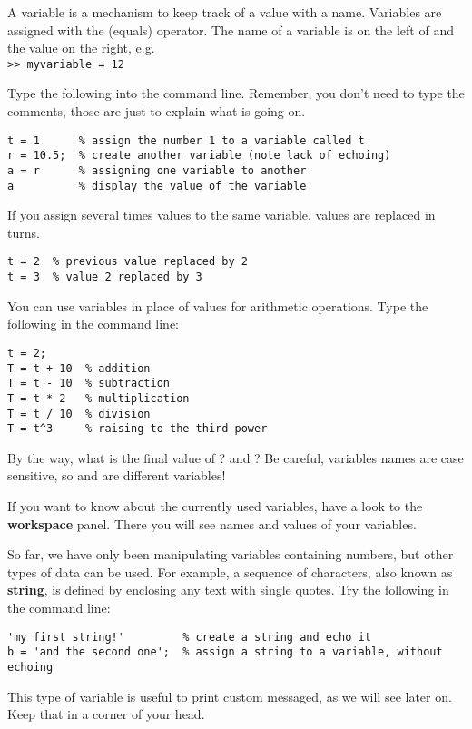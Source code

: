 \documentclass{article}
\begin{document}
A variable is a mechanism to keep track of a value with a name.
Variables are assigned with the \mcode{=} (equals) operator.
The name of a variable is on the left of \mcode{=} and the value on the right, e.g.\\
\verb|>> myvariable = 12|

Type the following into the command line.
Remember, you don't need to type the comments, those are just to explain what is going on.
\begin{lstlisting}
t = 1      % assign the number 1 to a variable called t
r = 10.5;  % create another variable (note lack of echoing)
a = r      % assigning one variable to another
a          % display the value of the variable
\end{lstlisting}

If you assign several times values to the same variable, values are replaced in turns.
\begin{lstlisting}
t = 2  % previous value replaced by 2
t = 3  % value 2 replaced by 3
\end{lstlisting}

You can use variables in place of values for arithmetic operations.
Type the following in the command line:
\begin{lstlisting}
t = 2;
T = t + 10  % addition
T = t - 10  % subtraction
T = t * 2   % multiplication
T = t / 10  % division
T = t^3     % raising to the third power
\end{lstlisting}

By the way, what is the final value of ? and ?
Be careful, variables names are case sensitive, so  and  are different variables!

If you want to know about the currently used variables, have a look to the \textbf{workspace} panel.
There you will see names and values of your variables.

So far, we have only been manipulating variables containing numbers, but other types of data can be used.
For example, a sequence of characters, also known as \textbf{string}, is defined by enclosing any text with single quotes.
Try the following in the command line:
\begin{lstlisting}
'my first string!'         % create a string and echo it
b = 'and the second one';  % assign a string to a variable, without echoing
\end{lstlisting}
This type of variable is useful to print custom messaged, as we will see later on.
Keep that in a corner of your head.
\end{document}
